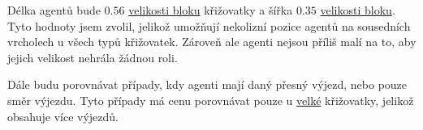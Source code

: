Délka agentů bude $0.56$ \hyperref[par:velikost_bloku]{velikosti bloku} křižovatky
a šířka $0.35$ \hyperref[par:velikost_bloku]{velikosti bloku}.
Tyto hodnoty jsem zvolil, jelikož umožňují nekolizní pozice agentů na sousedních vrcholech u všech typů křižovatek.
Zároveň ale agenti nejsou příliš malí na to, aby jejich velikost nehrála žádnou roli.

Dále budu porovnávat případy, kdy agenti mají daný přesný výjezd, nebo pouze směr výjezdu.
Tyto případy má cenu porovnávat pouze u
\hyperref[par:data_velka]{velké} křižovatky, jelikož obsahuje více výjezdů.
